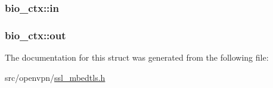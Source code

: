\subsubsection[{in}]{ bio\+\_\+ctx\+::in}\label{structbio__ctx_abc9a3f277ae77f310c1e3b79ad48ae26}
\hypertarget{structbio__ctx_aa9c670dd99822fb36115f6ebb7e4ccd2}{}
\subsubsection[{out}]{ bio\+\_\+ctx\+::out}\label{structbio__ctx_aa9c670dd99822fb36115f6ebb7e4ccd2}


The documentation for this struct was generated from the following file\+:\begin{DoxyCompactItemize}
\item 
src/openvpn/\hyperlink{ssl__mbedtls_8h}{ssl\+\_\+mbedtls.\+h}\end{DoxyCompactItemize}
